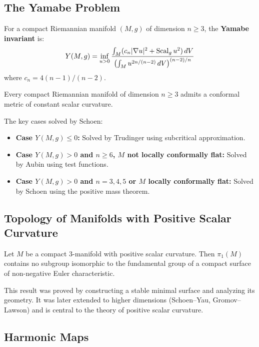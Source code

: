 \subsection{The Yamabe Problem}

\begin{definition}
For a compact Riemannian manifold $(M,g)$ of dimension $n \geq 3$, the \textbf{Yamabe invariant} is:
\[
Y(M,g) = \inf_{u > 0} \frac{\int_M (c_n |\nabla u|^2 + \operatorname{Scal}_g u^2) \, dV}{\left(\int_M u^{2n/(n-2)} \, dV\right)^{(n-2)/n}}
\]
where $c_n = 4(n-1)/(n-2)$.
\end{definition}

\begin{theorem}[Schoen, 1984]
Every compact Riemannian manifold of dimension $n \geq 3$ admits a conformal metric of constant scalar curvature.
\end{theorem}

The key cases solved by Schoen:
\begin{itemize}
    \item \textbf{Case $Y(M,g) \leq 0$:} Solved by Trudinger using subcritical approximation.
    \item \textbf{Case $Y(M,g) > 0$ and $n \geq 6$, $M$ not locally conformally flat:} Solved by Aubin using test functions.
    \item \textbf{Case $Y(M,g) > 0$ and $n = 3,4,5$ or $M$ locally conformally flat:} Solved by Schoen using the positive mass theorem.
\end{itemize}

\subsection{Topology of Manifolds with Positive Scalar Curvature}

\begin{theorem}
Let $M$ be a compact $3$-manifold with positive scalar curvature. Then $\pi_1(M)$ contains no subgroup isomorphic to the fundamental group of a compact surface of non-negative Euler characteristic.
\end{theorem}

This result was proved by constructing a stable minimal surface and analyzing its geometry. It was later extended to higher dimensions (Schoen--Yau, Gromov--Lawson) and is central to the theory of positive scalar curvature.

\subsection{Harmonic Maps}


